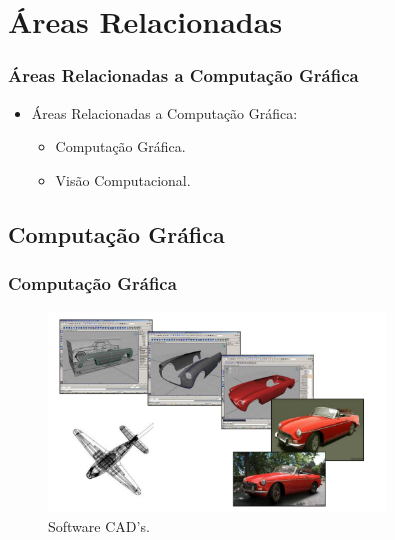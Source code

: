 \documentclass{beamer}
\begin{document}
\section{Áreas Relacionadas}


\begin{frame}
\frametitle{Áreas Relacionadas a Computação Gráfica}

\begin{block}

	\begin{itemize}
		\item<1-> Áreas Relacionadas a Computação Gráfica:
		\begin{itemize}
			\item Computação Gráfica.
			\item Visão Computacional.
			
		\end{itemize}
	\end{itemize}
\end{block}

\end{frame}




\subsection{Computação Gráfica}
\begin{frame}
\frametitle{Computação Gráfica}

	\begin{figure}[!h]
		\begin{center}
			\includegraphics[width=0.8\textwidth]{Figures/cad}
			\caption{Software CAD's.}
		\end{center}
		
	\end{figure}

\end{frame}
\end{document}
